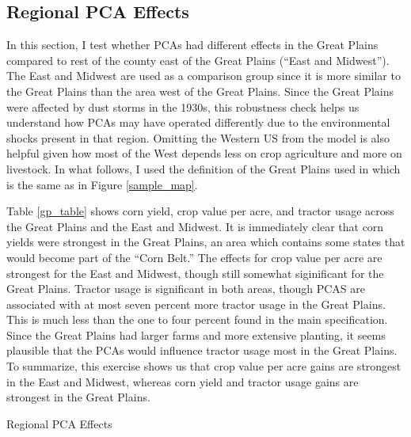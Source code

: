 \documentclass[12pt]{article}
\begin{document}
\begin{appendices}
\subsection{Regional PCA Effects}
\label{appendix:regional}
In this section, I test whether PCAs had different effects in the Great Plains compared to rest of the county east of the Great Plains (``East and Midwest'').
The East and Midwest are used as a comparison group since it is more similar to the Great Plains than the area west of the Great Plains.
Since the Great Plains were affected by dust storms in the 1930s, this robustness check helps us understand how PCAs may have operated differently due to the environmental shocks present in that region.
Omitting the Western US from the model is also helpful given how most of the West depends less on crop agriculture and more on livestock.
In what follows, I used the definition of the Great Plains used in \citet{hornbeck_enduring_2012} which is the same as in Figure \ref{sample_map}.

Table \ref{gp_table} shows corn yield, crop value per acre, and tractor usage across the Great Plains and the East and Midwest.
It is immediately clear that corn yields were strongest in the Great Plains, an area which contains some states that would become part of the ``Corn Belt.''
The effects for crop value per acre are strongest for the East and Midwest, though still somewhat siginificant for the Great Plains.
Tractor usage is significant in both areas, though PCAS are associated with at most seven percent more tractor usage in the Great Plains.
This is much less than the one to four percent found in the main specification.
Since the Great Plains had larger farms and more extensive planting, it seems plausible that the PCAs would influence tractor usage most in the Great Plains.
To summarize, this exercise shows us that crop value per acre gains are strongest in the East and Midwest, whereas corn yield and tractor usage gains are strongest in the Great Plains.





\begin{table}
    \caption{Regional PCA Effects}
    \label{gp_table}
    \centering
    \begin{threeparttable}[t]
        \footnotesize


\end{threeparttable}
\end{table}
\end{appendices}
\end{document}
